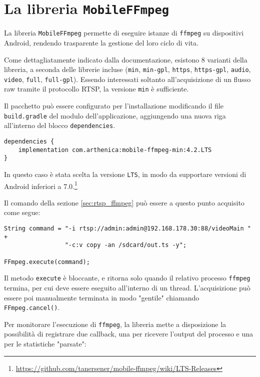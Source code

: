 \chapter{La libreria \texttt{MobileFFmpeg}}
\label{cha:allegato_ffmpeg}

La libreria \texttt{MobileFFmpeg} permette di eseguire istanze di \texttt{ffmpeg} su dispositivi Android, rendendo trasparente la gestione del loro ciclo di vita.

Come dettagliatamente indicato dalla documentazione\footnotemark{}, esistono 8 varianti della libreria, a seconda delle librerie incluse (\texttt{min}, \texttt{min-gpl}, \texttt{https}, \texttt{https-gpl}, \texttt{audio}, \texttt{video}, \texttt{full}, \texttt{full-gpl}). Essendo interessati soltanto all'acquisizione di un flusso raw tramite il protocollo RTSP, la versione \texttt{min} è sufficiente.


Il pacchetto può essere configurato per l'installazione modificando il file \texttt{build.gradle} del modulo dell'applicazione, aggiungendo una nuova riga all'interno del blocco \texttt{dependencies}.

\begin{verbatim}
dependencies {
    implementation com.arthenica:mobile-ffmpeg-min:4.2.LTS
}
\end{verbatim}

In questo caso è stata scelta la versione \texttt{LTS}, in modo da supportare versioni di Android inferiori a 7.0.\footnote{\url{https://github.com/tanersener/mobile-ffmpeg/wiki/LTS-Releases}}

Il comando della sezione \ref{sec:rtsp_ffmpeg} può essere a questo punto acquisito come segue:

\begin{verbatim}
String command = "-i rtsp://admin:admin@192.168.178.30:88/videoMain " +
                 "-c:v copy -an /sdcard/out.ts -y";
                 
FFmpeg.execute(command);
\end{verbatim}

Il metodo \texttt{execute} è bloccante, e ritorna solo quando il relativo processo \texttt{ffmpeg} termina, per cui deve essere eseguito all'interno di un thread. L'acquisizione può essere poi manualmente terminata in modo "gentile" chiamando \texttt{FFmpeg.cancel()}.

Per monitorare l'esecuzione di \texttt{ffmpeg}, la libreria mette a disposizione la possibilità di registrare due callback, una per ricevere l'output del processo e una per le statistiche "parsate":


